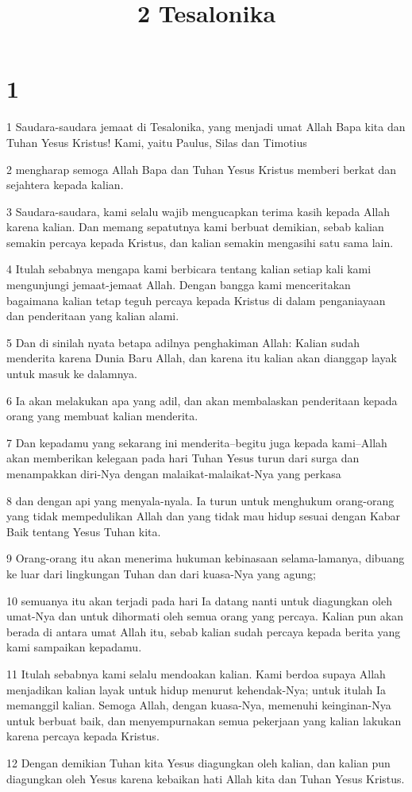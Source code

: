 

\title{2 Tesalonika}


\chapter{1}

\par 1 Saudara-saudara jemaat di Tesalonika, yang menjadi umat Allah Bapa kita dan Tuhan Yesus Kristus! Kami, yaitu Paulus, Silas dan Timotius
\par 2 mengharap semoga Allah Bapa dan Tuhan Yesus Kristus memberi berkat dan sejahtera kepada kalian.
\par 3 Saudara-saudara, kami selalu wajib mengucapkan terima kasih kepada Allah karena kalian. Dan memang sepatutnya kami berbuat demikian, sebab kalian semakin percaya kepada Kristus, dan kalian semakin mengasihi satu sama lain.
\par 4 Itulah sebabnya mengapa kami berbicara tentang kalian setiap kali kami mengunjungi jemaat-jemaat Allah. Dengan bangga kami menceritakan bagaimana kalian tetap teguh percaya kepada Kristus di dalam penganiayaan dan penderitaan yang kalian alami.
\par 5 Dan di sinilah nyata betapa adilnya penghakiman Allah: Kalian sudah menderita karena Dunia Baru Allah, dan karena itu kalian akan dianggap layak untuk masuk ke dalamnya.
\par 6 Ia akan melakukan apa yang adil, dan akan membalaskan penderitaan kepada orang yang membuat kalian menderita.
\par 7 Dan kepadamu yang sekarang ini menderita--begitu juga kepada kami--Allah akan memberikan kelegaan pada hari Tuhan Yesus turun dari surga dan menampakkan diri-Nya dengan malaikat-malaikat-Nya yang perkasa
\par 8 dan dengan api yang menyala-nyala. Ia turun untuk menghukum orang-orang yang tidak mempedulikan Allah dan yang tidak mau hidup sesuai dengan Kabar Baik tentang Yesus Tuhan kita.
\par 9 Orang-orang itu akan menerima hukuman kebinasaan selama-lamanya, dibuang ke luar dari lingkungan Tuhan dan dari kuasa-Nya yang agung;
\par 10 semuanya itu akan terjadi pada hari Ia datang nanti untuk diagungkan oleh umat-Nya dan untuk dihormati oleh semua orang yang percaya. Kalian pun akan berada di antara umat Allah itu, sebab kalian sudah percaya kepada berita yang kami sampaikan kepadamu.
\par 11 Itulah sebabnya kami selalu mendoakan kalian. Kami berdoa supaya Allah menjadikan kalian layak untuk hidup menurut kehendak-Nya; untuk itulah Ia memanggil kalian. Semoga Allah, dengan kuasa-Nya, memenuhi keinginan-Nya untuk berbuat baik, dan menyempurnakan semua pekerjaan yang kalian lakukan karena percaya kepada Kristus.
\par 12 Dengan demikian Tuhan kita Yesus diagungkan oleh kalian, dan kalian pun diagungkan oleh Yesus karena kebaikan hati Allah kita dan Tuhan Yesus Kristus.

